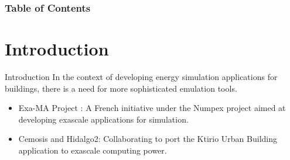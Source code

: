 \documentclass[10pt]{beamer}
\begin{document}
\begin{frame}
    \frametitle{Table of Contents}
    \begin{multicols}{2} %
        \tableofcontents
    \end{multicols}
    \end{frame}


\section{Introduction}
\begin{frame}{Introduction}
  In the context of developing energy simulation applications for buildings, there is a need for more sophisticated emulation tools.

\begin{itemize}
    \item Exa-MA Project : A French initiative under the Numpex project aimed at developing exascale applications for simulation.
    \item Cemosis and Hidalgo2: Collaborating to port the Ktirio Urban Building application to exascale computing power.
\end{itemize}

\end{frame}
\end{document}

